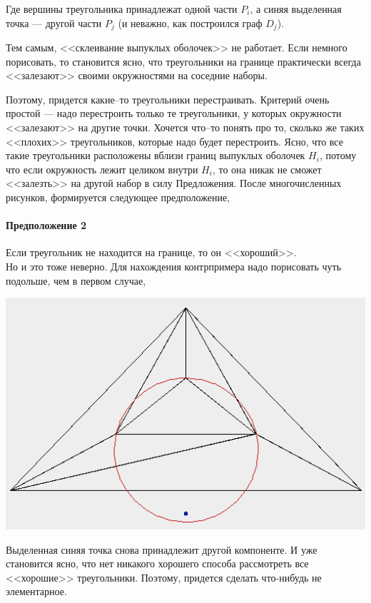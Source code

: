 \documentclass{article}
\begin{document}
	Где вершины треугольника принадлежат одной части $P_i$, а синяя выделенная точка --- другой части $P_j$ (и неважно, как построился граф $D_j$).
	
	Тем самым, <<склеивание выпуклых оболочек>> не работает. Если немного порисовать, то становится ясно, что треугольники на границе практически всегда <<залезают>> своими окружностями на соседние наборы. 
	
	Поэтому, придется какие--то треугольники перестраивать. Критерий очень простой --- надо перестроить только те треугольники, у которых окружности <<залезают>> на другие точки. Хочется что--то понять про то, сколько же таких <<плохих>> треугольников, которые надо будет перестроить. Ясно, что все такие треугольники расположены вблизи границ выпуклых оболочек $H_i$, потому что если окружность лежит целиком внутри $H_i$, то она никак не сможет <<залезть>> на другой набор в силу Предложения. После многочисленных рисунков, формируется следующее предположение,
	
	\paragraph{Предположение 2\\}
	    Если треугольник не находится на границе, то он <<хороший>>.\\
       
    Но и это тоже неверно. Для нахождения контрпримера надо порисовать чуть подольше, чем в первом случае,
            
	
	\begin{center}
	    \includegraphics[scale = 0.5]{delaunay2.png}
	\end{center}
	
	Выделенная синяя точка снова принадлежит другой компоненте. И уже становится ясно, что нет никакого хорошего способа рассмотреть все <<хорошие>> треугольники. Поэтому, придется сделать что-нибудь не элементарное. 
	
\end{document}

